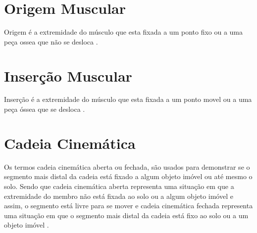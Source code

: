\section[Origem Muscular]{Origem Muscular}
Origem é a extremidade do músculo que esta fixada a um ponto fixo ou a uma peça ossea que não se desloca \cite{sisMuscular}.

\section[Inserção Muscular]{Inserção Muscular}
Inserção é a extremidade do músculo que esta fixada a um ponto movel ou a uma peça óssea que se desloca \cite{sisMuscular}.

\section[Cadeia Cinemática]{Cadeia Cinemática}
Os termos cadeia cinemática aberta ou fechada, são usados para demonstrar se o segmento mais distal da cadeia está fixado a algum objeto imóvel ou até mesmo o solo.
Sendo que cadeia cinemática aberta representa uma situação em que a extremidade do membro não está fixada ao solo ou a algum objeto imóvel e assim, o segmento está livre para se mover e cadeia cinemática fechada representa uma situação em que o segmento mais distal da cadeia está fixo ao solo ou a um objeto imóvel \cite{silva2015cinesiologia}.